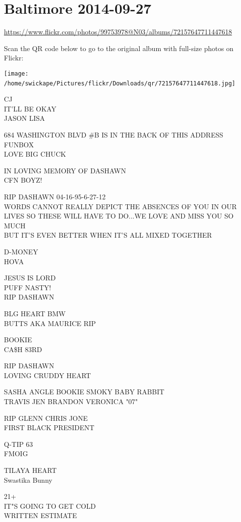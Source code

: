 \documentclass[10pt,letterpaper]{article}
\begin{document}
\section*{Baltimore 2014-09-27}

\url{https://www.flickr.com/photos/99753978@N03/albums/72157647711447618}

Scan the QR code below to go to the original album with full-size photos on Flickr:

\texttt{[image: /home/swickape/Pictures/flickr/Downloads/qr/72157647711447618.jpg]}
\

CJ\\
IT'LL BE OKAY\\
JASON LISA

684 WASHINGTON BLVD \#B IS IN THE BACK OF THIS ADDRESS\\
FUNBOX\\
LOVE BIG CHUCK

IN LOVING MEMORY OF DASHAWN\\
CFN BOYZ!

RIP DASHAWN 04{-}16{-}95{-}6{-}27{-}12\\
WORDS CANNOT REALLY DEPICT THE ABSENCES OF YOU IN OUR LIVES SO THESE WILL HAVE TO DO...WE LOVE AND MISS YOU SO MUCH\\
BUT IT'S EVEN BETTER WHEN IT'S ALL MIXED TOGETHER

D{-}MONEY\\
HOVA

JESUS IS LORD\\
PUFF NASTY!\\
RIP DASHAWN

BLG HEART BMW\\
BUTTS AKA MAURICE RIP

BOOKIE\\
CA\$H 83RD

RIP DASHAWN\\
LOVING CRUDDY HEART

SASHA ANGLE BOOKIE SMOKY BABY RABBIT\\
TRAVIS JEN BRANDON VERONICA "07"

RIP GLENN CHRIS JONE\\
FIRST BLACK PRESIDENT

Q{-}TIP 63\\
FMOIG

TILAYA HEART\\
Swastika Bunny

21+\\
IT"S GOING TO GET COLD\\
WRITTEN ESTIMATE
\end{document}
